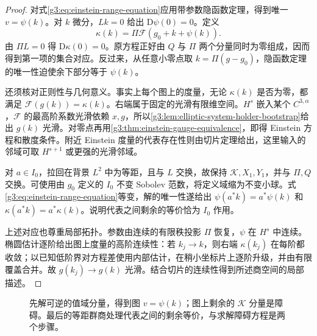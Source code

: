 \begin{proof}
	对式\eqref{g3:eq:einstein-range-equation}应用带参数隐函数定理，得到唯一 \(v=\psi(k)\)。对 \(k\) 微分，\(Lk=0\) 给出 \(\mathrm D\psi(0)=0\)。定义
	\begin{equation}\label{g3:eq:einstein-obstruction-map}
		\kappa(k)=\Pi\mathcal F(g_0+k+\psi(k)).
	\end{equation}
	由 \(\Pi L=0\) 得 \(\mathrm D\kappa(0)=0\)。原方程正好由 \(Q\) 与 \(\Pi\) 两个分量同时为零组成，因而得到第一项的集合对应。反过来，从任意小零点取 \(k=\Pi(g-g_0)\)，隐函数定理的唯一性迫使余下部分等于 \(\psi(k)\)。

	还须核对正则性与几何意义。事实上每个图上的度量，无论 \(\kappa(k)\) 是否为零，都满足 \(\mathcal F(g(k))=\kappa(k)\)。右端属于固定的光滑有限维空间。\(H^s\) 嵌入某个 \(C^{3,\alpha}\)，\(\mathcal F\) 的最高阶系数光滑依赖 \(x,g\)，所以\cref{g3:lem:elliptic-system-holder-bootstrap}给出 \(g(k)\) 光滑。对零点再用\cref{g3:thm:einstein-gauge-equivalence}，即得 Einstein 方程和散度条件。附近 Einstein 度量的代表存在性则由切片定理给出，这里输入的邻域可取 \(H^{s+1}\) 或更强的光滑邻域。

	对 \(a\in I_0\)，拉回在背景 \(L^2\) 中为等距，且与 \(L\) 交换，故保持 \(\mathcal K,X_1,Y_1\)，并与 \(\Pi,Q\) 交换。可使用由 \(g_0\) 定义的 \(I_0\) 不变 Sobolev 范数，将定义域缩为不变小球。式\eqref{g3:eq:einstein-range-equation}等变，解的唯一性遂给出 \(\psi(a^*k)=a^*\psi(k)\) 和 \(\kappa(a^*k)=a^*\kappa(k)\)。说明代表之间剩余的等价恰为 \(I_0\) 作用。

	上述对应也尊重局部拓扑。参数由连续的有限秩投影 \(\Pi\) 恢复，\(\psi\) 在 \(H^s\) 中连续。椭圆估计逐阶给出图上度量的高阶连续性：若 \(k_j\to k\)，则右端 \(\kappa(k_j)\) 在每阶都收敛；以已知低阶界对方程差使用内部估计，在稍小坐标片上逐阶升级，并由有限覆盖合并。故 \(g(k_j)\to g(k)\) 光滑。结合切片的连续性得到所述商空间的局部描述。
\end{proof}

\begin{figure}[htbp]
	\centering
	
	\caption[Einstein 方程的有限维约化]{先解可逆的值域分量，得到图 \(v=\psi(k)\)；图上剩余的 \(\mathcal K\) 分量是障碍。最后的等距群商处理代表之间的剩余等价，与求解障碍方程是两个步骤。}
	\label{g3:fig:einstein-obstruction-reduction}
\end{figure}

